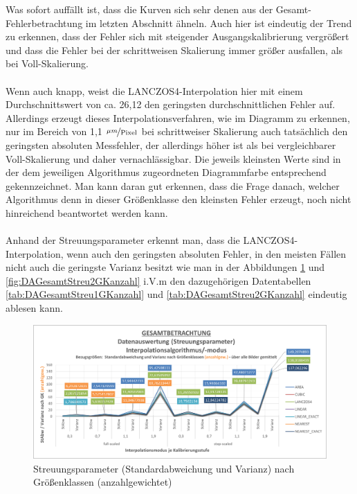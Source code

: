 \documentclass[
fontsize=10pt, 
listof = totoc,
parskip = half	
]{report}
\begin{document}
\noindent Was sofort auffällt ist, dass die Kurven sich sehr denen aus der Gesamt-Fehlerbetrachtung im letzten Abschnitt ähneln. Auch hier ist eindeutig der Trend zu erkennen, dass der Fehler sich mit steigender Ausgangskalibrierung vergrößert und dass die Fehler bei der schrittweisen Skalierung immer größer ausfallen, als bei Voll-Skalierung. 
\\\\
Wenn auch knapp, weist die LANCZOS4-Interpolation hier mit einem Durchschnittswert von ca. 26,12 den geringsten durchschnittlichen Fehler auf. Allerdings erzeugt dieses Interpolationsverfahren, wie im Diagramm zu erkennen, nur im Bereich von 1,1 $\nicefrac{\mu m}{\text{Pixel}}$ bei schrittweiser Skalierung auch tatsächlich den geringsten absoluten Messfehler, der allerdings höher ist als bei vergleichbarer Voll-Skalierung und daher vernachlässigbar. Die jeweils kleinsten Werte sind in der dem jeweiligen Algorithmus zugeordneten Diagrammfarbe entsprechend gekennzeichnet. Man kann daran gut erkennen, dass die Frage danach, welcher Algorithmus denn in dieser Größenklasse den kleinsten Fehler erzeugt, noch nicht hinreichend beantwortet werden kann.
\\\\
Anhand der Streuungsparameter erkennt man, dass die LANCZOS4-Interpolation, wenn auch den geringsten absoluten Fehler, in den meisten Fällen nicht auch die geringste Varianz besitzt wie man in der Abbildungen \ref{fig:DAGesamtStreu1GKanzahl} und \ref{fig:DAGesamtStreu2GKanzahl} i.V.m  den dazugehörigen Datentabellen \ref{tab:DAGesamtStreu1GKanzahl} und \ref{tab:DAGesamtStreu2GKanzahl} eindeutig ablesen kann.

\begin{figure}[H]
	\centering
	\includegraphics[width=\textwidth, height=\textheight, keepaspectratio]{pics/DA_Gesamt_Streu1_GKanzahl}
	\caption{Streuungsparameter (Standardabweichung und Varianz) nach Größenklassen (anzahlgewichtet)}
	\label{fig:DAGesamtStreu1GKanzahl}
\end{figure}
\end{document}
